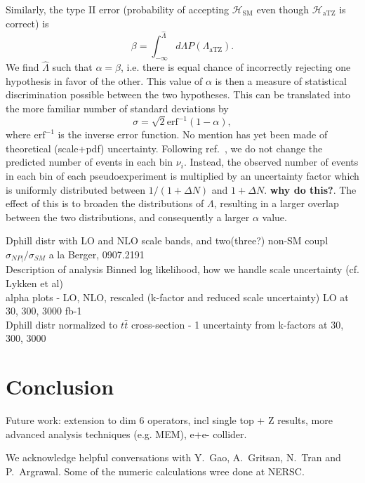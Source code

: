 \documentclass[preprint]{JHEP3} %
\newcommand{\SM}{\mathrm{SM}}
\newcommand{\aTZ}{\mathrm{aTZ}}
\def\hLambda {\hat{\Lambda}}
\def\erf{\mathrm{erf}}
\begin{document}
Similarly, the type II error (probability of accepting $\mathcal{H}_{\SM}$ even though $\mathcal{H}_{\aTZ}$ is correct) is 
\begin{equation}
\beta = \int^{\hLambda}_{-\infty} d\Lambda P(\Lambda_{\aTZ}).
\end{equation}
We find $\hLambda$ such that $\alpha=\beta$, i.e. there is equal chance of incorrectly rejecting one hypothesis in favor of the other. This value of $\alpha$ is then a measure of statistical discrimination possible between the two hypotheses. This can be translated into the more familiar number of standard deviations by 
\begin{equation}
\sigma = \sqrt{2}\erf^{-1}(1-\alpha),
\end{equation}
where $\erf^{-1}$ is the inverse error function. 
No mention has yet been made of theoretical (scale+pdf) uncertainty. Following ref.~\cite{Lykken et al}, we do not change the predicted number of events in each bin $\nu_i$. Instead, the observed number of events in each bin of each pseudoexperiment is multiplied by an uncertainty factor which is uniformly distributed between $1/(1+\Delta N)$ and $1+\Delta N$. {\bf why do this?}. The effect of this is to broaden the distributions of $\Lambda$, resulting in a larger overlap between the two distributions, and consequently a larger $\alpha$ value.





Dphill distr with LO and NLO scale bands, and two(three?) non-SM coupl\\
$\sigma_{NP|} / \sigma_{SM}$ a la Berger, 0907.2191 \\

Description of analysis Binned log likelihood, how we handle scale uncertainty (cf. Lykken et al) \\
alpha plots - LO, NLO, rescaled (k-factor and reduced scale uncertainty) LO at 30, 300, 3000 fb-1\\
Dphill distr normalized to $t\bar{t}$ cross-section  - 1 uncertainty from k-factors at 30, 300, 3000\\

\section{Conclusion}
Future work: extension to dim 6 operators, incl single top + Z results, more advanced analysis techniques (e.g. MEM), e+e- collider.
%


\acknowledgments
We acknowledge helpful conversations with Y.~Gao, A.~Gritsan, N.~Tran and P.~Argrawal. 
Some of the numeric calculations wree done at NERSC.
\end{document}
